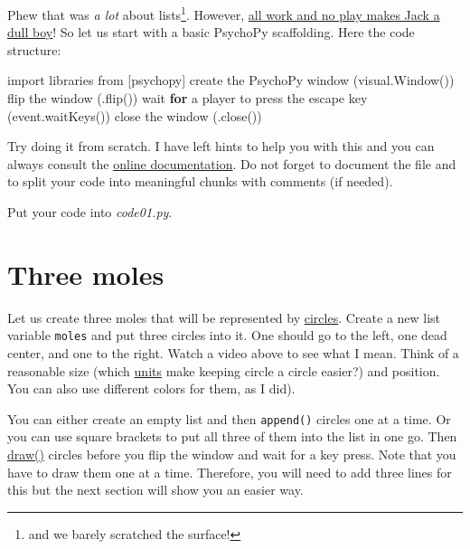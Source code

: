 \documentclass[
]{book}
\newenvironment{Shaded}{\begin{snugshade}}{\end{snugshade}}
\newcommand{\ControlFlowTok}[1]{\textcolor[rgb]{0.13,0.29,0.53}{\textbf{#1}}}
\newcommand{\ImportTok}[1]{#1}
\newcommand{\NormalTok}[1]{#1}
\begin{document}
Phew that was \emph{a lot} about lists\footnote{and we barely scratched the surface!}. However, \href{https://en.wikipedia.org/wiki/All_work_and_no_play_makes_Jack_a_dull_boy}{all work and no play makes Jack a dull boy}! So let us start with a basic PsychoPy scaffolding. Here the code structure:

\begin{Shaded}
\begin{Highlighting}[]
\ImportTok{import}\NormalTok{ libraries }\ImportTok{from}\NormalTok{ [psychopy]}
\NormalTok{create the PsychoPy window (visual.Window())}
\NormalTok{flip the window (.flip())}
\NormalTok{wait }\ControlFlowTok{for}\NormalTok{ a player to press the escape key (event.waitKeys())}
\NormalTok{close the window (.close())}
\end{Highlighting}
\end{Shaded}

Try doing it from scratch. I have left hints to help you with this and you can always consult the \href{https://psychopy.org/api/index.html}{online documentation}. Do not forget to document the file and to split your code into meaningful chunks with comments (if needed).

Put your code into \emph{code01.py}.

\hypertarget{three-moles}{%
\section{Three moles}\label{three-moles}}

Let us create three moles that will be represented by \href{https://psychopy.org/api/visual/circle.html\#psychopy.visual.circle.Circle}{circles}. Create a new list variable \texttt{moles} and put three circles into it. One should go to the left, one dead center, and one to the right. Watch a video above to see what I mean. Think of a reasonable size (which \protect\hyperlink{psychopy-units}{units} make keeping circle a circle easier?) and position. You can also use different colors for them, as I did).

You can either create an empty list and then \texttt{append()} circles one at a time. Or you can use square brackets to put all three of them into the list in one go. Then \href{https://psychopy.org/api/visual/circle.html\#psychopy.visual.circle.Circle.draw}{draw()} circles before you flip the window and wait for a key press. Note that you have to draw them one at a time. Therefore, you will need to add three lines for this but the next section will show you an easier way.
\end{document}
